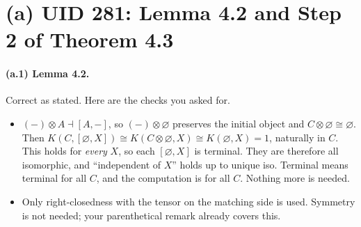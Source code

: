 \documentclass[11pt]{article}
\begin{document}
\section*{(a) UID 281: Lemma 4.2 and Step 2 of Theorem 4.3}

\paragraph{(a.1) Lemma 4.2.} Correct as stated. Here are the checks you asked for.
\begin{itemize}
\item $(-)\otimes A\dashv[A,-]$, so $(-)\otimes\varnothing$ preserves the initial object and $C\otimes\varnothing\cong\varnothing$.
  Then $K(C,[\varnothing,X])\cong K(C\otimes\varnothing,X)\cong K(\varnothing,X)=1$, naturally in $C$. This holds
  for \emph{every} $X$, so each $[\varnothing,X]$ is terminal. They are therefore all isomorphic, and
  ``independent of $X$'' holds up to unique iso. Terminal means terminal for all $C$, and the computation
  is for all $C$. Nothing more is needed.
\item Only right-closedness with the tensor on the matching side is used. Symmetry is not needed; your parenthetical remark
  already covers this.
\end{itemize}
\end{document}
